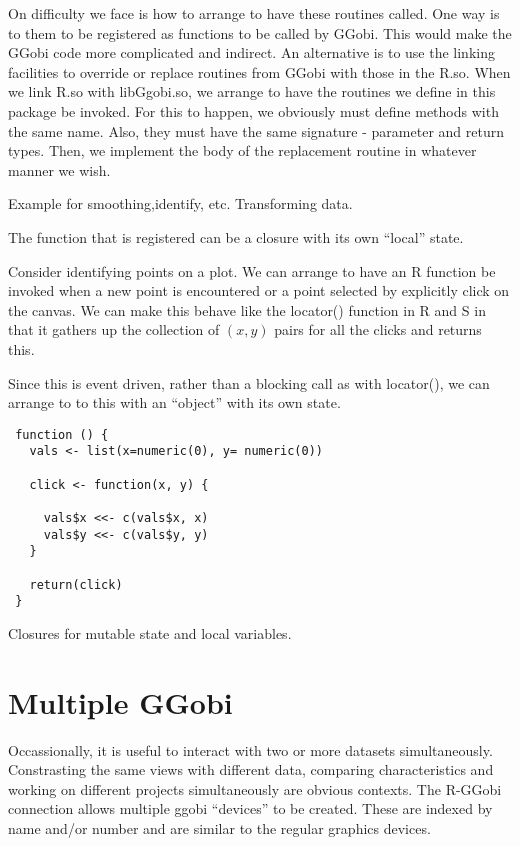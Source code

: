 \documentclass{article}
\begin{document}
On difficulty we face is how to arrange to have these routines called.
One way is to them to be registered as functions to be called by
GGobi. This would make the GGobi code more complicated and indirect.
An alternative is to use the linking facilities to override or replace
routines from GGobi with those in the R.so.  When we link R.so with
libGgobi.so, we arrange to have the routines we define in this package
be invoked.  For this to happen, we obviously must define methods with
the same name. Also, they must have the same signature - parameter and
return types. Then, we implement the body of the replacement
routine in whatever manner we wish.





Example for smoothing,identify, etc.
Transforming data.



The function that is registered can be a closure
with its own ``local'' state.


Consider identifying points on a plot.  We can arrange to have an R
function be invoked when a new point is encountered or a point
selected by explicitly click on the canvas.
We can make this behave like the locator() function
in R and S in that it gathers up the collection of 
$(x, y)$ pairs for all the clicks
and returns this.

Since this is event driven, rather than a blocking call as with
locator(), we can arrange to to this with an ``object'' with its own
state.
\begin{verbatim}
 function () {
   vals <- list(x=numeric(0), y= numeric(0))

   click <- function(x, y) {
    
     vals$x <<- c(vals$x, x)
     vals$y <<- c(vals$y, y)
   }

   return(click)
 }
\end{verbatim}



Closures for mutable state and local variables.



\section{Multiple GGobi}
Occassionally, it is useful to interact with two or more datasets
simultaneously. Constrasting the same views with different data,
comparing characteristics and working on different projects
simultaneously are obvious contexts. The R-GGobi connection allows
multiple ggobi ``devices'' to be created.  These are indexed by name
and/or number and are similar to the regular graphics devices.
\end{document}
